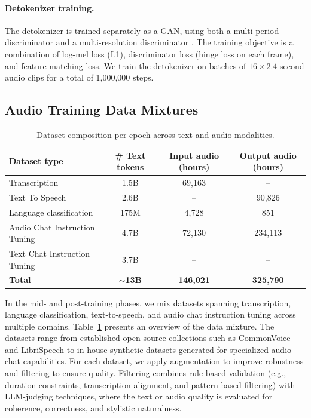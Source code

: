 \documentclass{article}
\begin{document}
\paragraph{Detokenizer training.}
The detokenizer is trained separately as a GAN, using both a multi-period discriminator \citep{kong20mpd} and a multi-resolution discriminator \citep{jang21mrd}. The training objective is a combination of log-mel loss (L1), discriminator loss (hinge loss on each frame), and feature matching loss. We train the detokenizer on batches of $16 \times 2.4$ second audio clips for a total of 1,000,000 steps.

\subsection{Audio Training Data Mixtures}
\label{sec:audio_data}

\begin{table}
\centering
\begin{tabular}{lccc}
\toprule
\textbf{Dataset type} & \textbf{\# Text tokens} & \textbf{Input audio (hours)} & \textbf{Output audio (hours)} \\
\midrule
Transcription & 1.5B & 69,163 & -- \\
Text To Speech & 2.6B & -- & 90,826 \\
Language classification & 175M & 4,728 & 851 \\
Audio Chat Instruction Tuning & 4.7B & 72,130 & 234,113 \\
Text Chat Instruction Tuning & 3.7B & -- & -- \\
\midrule
\textbf{Total} & \textbf{$\sim$13B} & \textbf{146,021} & \textbf{325,790} \\
\bottomrule
\end{tabular}
\caption{Dataset composition per epoch across text and audio modalities.}
\label{tab:dataset_composition}
\end{table}

In the mid- and post-training phases, we mix datasets spanning transcription, language classification, text-to-speech, and audio chat instruction tuning across multiple domains. Table~\ref{tab:dataset_composition} presents an overview of the data mixture. The datasets range from established open-source collections such as CommonVoice and LibriSpeech to in-house synthetic datasets generated for specialized audio chat capabilities. For each dataset, we apply augmentation to improve robustness and filtering to ensure quality. Filtering combines rule-based validation (e.g., duration constraints, transcription alignment, and pattern-based filtering) with LLM-judging techniques, where the text or audio quality is evaluated for coherence, correctness, and stylistic naturalness.
\end{document}
